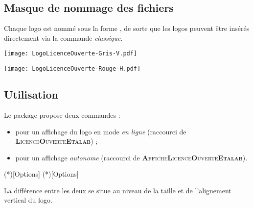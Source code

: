 \documentclass[french,11pt,a4paper]{article}
\begin{document}
\subsection{Masque de nommage des fichiers}

Chaque logo est nommé sous la forme , de sorte que les logos peuvent être insérés directement via la commande  \textit{classique}.

\begin{demohigh}[language=latex/latex3,style/main=cyan!10,style/code=cyan!10,style/demo=cyan!10]
\texttt{[image: LogoLicenceOuverte-Gris-V.pdf]}\par
\texttt{[image: LogoLicenceOuverte-Rouge-H.pdf]}
\end{demohigh}

\subsection{Utilisation}

Le package propose deux commandes :

\medskip

\begin{itemize}
	\item {} pour un affichage du logo en mode \textit{en ligne} (raccourci de \textsc{\textbf{L}icence\textbf{O}uverte\textbf{Etalab}}) ;
	\item {} pour un affichage \textit{autonome} (raccourci de \textsc{\textbf{Aff}iche\textbf{L}icence\textbf{O}uverte\textbf{Etalab}}).
\end{itemize}

\medskip

\begin{codehigh}[language=latex/latex2,style/main=cyan!10,style/code=cyan!10]
\loetalab(*)[Options]
\affloetalab(*)[Options]
\end{codehigh}

La différence entre les deux se situe au niveau de la taille et de l'alignement vertical du logo.

\begin{demohigh}[language=latex/latex3,style/main=cyan!10,style/code=cyan!10,style/demo=cyan!10]
\loetalab
\end{demohigh}

\begin{demohigh}[language=latex/latex3,style/main=cyan!10,style/code=cyan!10,style/demo=cyan!10]
\loetalab*
\end{demohigh}
\end{document}
